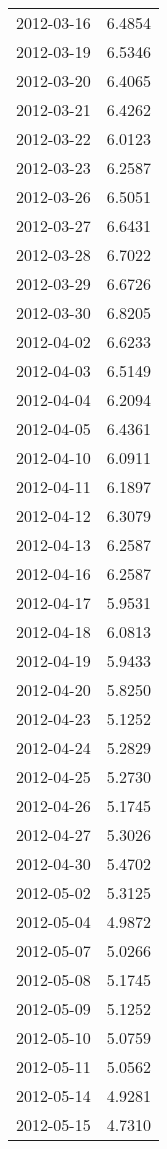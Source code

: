 \begin{tabular}{lr}
2012-03-16 &      6.4854 \\
2012-03-19 &      6.5346 \\
2012-03-20 &      6.4065 \\
2012-03-21 &      6.4262 \\
2012-03-22 &      6.0123 \\
2012-03-23 &      6.2587 \\
2012-03-26 &      6.5051 \\
2012-03-27 &      6.6431 \\
2012-03-28 &      6.7022 \\
2012-03-29 &      6.6726 \\
2012-03-30 &      6.8205 \\
2012-04-02 &      6.6233 \\
2012-04-03 &      6.5149 \\
2012-04-04 &      6.2094 \\
2012-04-05 &      6.4361 \\
2012-04-10 &      6.0911 \\
2012-04-11 &      6.1897 \\
2012-04-12 &      6.3079 \\
2012-04-13 &      6.2587 \\
2012-04-16 &      6.2587 \\
2012-04-17 &      5.9531 \\
2012-04-18 &      6.0813 \\
2012-04-19 &      5.9433 \\
2012-04-20 &      5.8250 \\
2012-04-23 &      5.1252 \\
2012-04-24 &      5.2829 \\
2012-04-25 &      5.2730 \\
2012-04-26 &      5.1745 \\
2012-04-27 &      5.3026 \\
2012-04-30 &      5.4702 \\
2012-05-02 &      5.3125 \\
2012-05-04 &      4.9872 \\
2012-05-07 &      5.0266 \\
2012-05-08 &      5.1745 \\
2012-05-09 &      5.1252 \\
2012-05-10 &      5.0759 \\
2012-05-11 &      5.0562 \\
2012-05-14 &      4.9281 \\
2012-05-15 &      4.7310 \\

\end{tabular}
